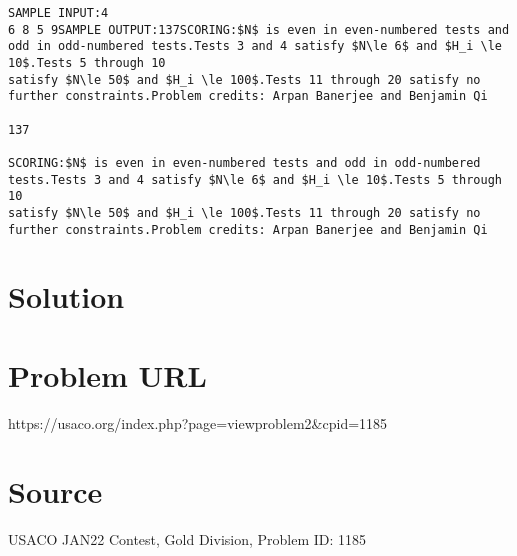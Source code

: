 \documentclass[12pt]{article}
\begin{document}
\begin{verbatim}
SAMPLE INPUT:4
6 8 5 9SAMPLE OUTPUT:137SCORING:$N$ is even in even-numbered tests and odd in odd-numbered tests.Tests 3 and 4 satisfy $N\le 6$ and $H_i \le 10$.Tests 5 through 10
satisfy $N\le 50$ and $H_i \le 100$.Tests 11 through 20 satisfy no
further constraints.Problem credits: Arpan Banerjee and Benjamin Qi

137

SCORING:$N$ is even in even-numbered tests and odd in odd-numbered tests.Tests 3 and 4 satisfy $N\le 6$ and $H_i \le 10$.Tests 5 through 10
satisfy $N\le 50$ and $H_i \le 100$.Tests 11 through 20 satisfy no
further constraints.Problem credits: Arpan Banerjee and Benjamin Qi
\end{verbatim}

\section*{Solution}


\section*{Problem URL}
https://usaco.org/index.php?page=viewproblem2&cpid=1185

\section*{Source}
USACO JAN22 Contest, Gold Division, Problem ID: 1185
\end{document}
